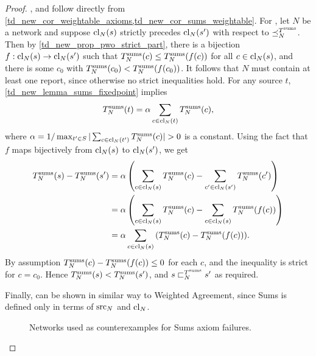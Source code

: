 \begin{proof}
    \claimcoherence{}, \marginaltrustworthiness{} and \trustbasedmon{} follow
    directly from
    \cref{td_new_cor_weightable_axioms,td_new_cor_sums_weightable}. For
    \sourcecoherence{}, let $N$ be a network and suppose $\operatorname{cl}_N(s)$ strictly
    precedes $\operatorname{cl}_N(s')$ with respect to $\preceq_N^{T^{\operatorname{sums}}}$. Then by
    \cref{td_new_prop_pwo_strict_part}, there is a bijection $f: \operatorname{cl}_N(s)
    \to \operatorname{cl}_N(s')$ such that $T^{\operatorname{sums}}_N(c) \le T^{\operatorname{sums}}_N(f(c))$ for all $c \in
    \operatorname{cl}_N(s)$, and there is some $c_0$ with $T^{\operatorname{sums}}_N(c_0) <
    T^{\operatorname{sums}}_N(f(c_0))$. It follows that $N$ must contain at least one report,
    since otherwise no strict inequalities hold. For any source $t$,
    \cref{td_new_lemma_sums_fixedpoint} implies
    \[
        T^{\operatorname{sums}}_N(t)
        = \alpha \sum_{c \in \operatorname{cl}_N(t)}{T^{\operatorname{sums}}_N(c)},
    \]
    where $\alpha = 1 / \max_{t' \in S}{|\sum_{c \in
    \operatorname{cl}_N(t')}{T^{\operatorname{sums}}_N(c)}|} > 0$ is a constant. Using the fact that
    $f$ maps bijectively from $\operatorname{cl}_N(s)$ to $\operatorname{cl}_N(s')$, we get
    \begin{align*}
        T^{\operatorname{sums}}_N(s) - T^{\operatorname{sums}}_N(s')
        &= \alpha \left(
            \sum_{c \in \operatorname{cl}_N(s)}{T^{\operatorname{sums}}_N(c)}
            -
            \sum_{c' \in \operatorname{cl}_N(s')}{T^{\operatorname{sums}}_N(c')}
        \right) \\
        &= \alpha \left(
            \sum_{c \in \operatorname{cl}_N(s)}{T^{\operatorname{sums}}_N(c)}
            -
            \sum_{c \in \operatorname{cl}_N(s)}{T^{\operatorname{sums}}_N(f(c))}
        \right) \\
        &= \alpha \sum_{c \in \operatorname{cl}_N(s)}{\left(
            T^{\operatorname{sums}}_N(c) - T^{\operatorname{sums}}_N(f(c))
        \right)}.
    \end{align*}
    By assumption $T^{\operatorname{sums}}_N(c) - T^{\operatorname{sums}}_N(f(c)) \le 0$ for each $c$, and the
    inequality is strict for $c = c_0$. Hence $T^{\operatorname{sums}}_N(s) < T^{\operatorname{sums}}_N(s')$, and
    $s \sqsubset_N^{T^{\operatorname{sums}}} s'$ as required.

    Finally, \symmetry{} can be shown in similar way to Weighted Agreement,
    since Sums is defined only in terms of $\operatorname{src}_N$ and $\operatorname{cl}_N$.

    \begin{figure}
        \centering
        \caption{
            Networks used as counterexamples for Sums axiom failures.
        }
        \label{td_new_fig_sums_counterex}
    \end{figure}


\end{proof}
